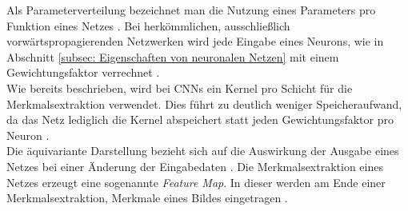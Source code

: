 		Als Parameterverteilung bezeichnet man die Nutzung eines Parameters pro Funktion eines Netzes \cite{deeplearning}. Bei herkömmlichen, ausschließlich vorwärtspropagierenden Netzwerken wird jede Eingabe eines Neurons, wie in Abschnitt \ref{subsec: Eigenschaften von neuronalen Netzen} mit einem Gewichtungsfaktor verrechnet \cite{deeplearning}.\\
		
		Wie bereits beschrieben, wird bei CNNs ein Kernel pro Schicht für die Merkmalsextraktion verwendet. Dies führt zu deutlich weniger Speicheraufwand, da das Netz lediglich die Kernel abspeichert statt jeden Gewichtungsfaktor pro Neuron \cite{deeplearning}.\\
		
		Die äquivariante Darstellung bezieht sich auf die Auswirkung der Ausgabe eines Netzes bei einer Änderung der Eingabedaten \cite{deeplearning}. Die Merkmalsextraktion eines Netzes erzeugt eine sogenannte \textit{Feature Map}. In dieser werden am Ende einer Merkmalsextraktion, Merkmale eines Bildes eingetragen \cite{deeplearning}.\\		
		
	
		
